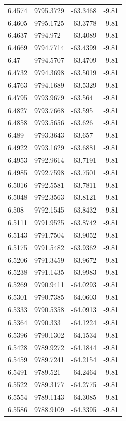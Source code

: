 \begin{table}[H]
\begin{tabular}{llll}
6.4574 & 9795.3729 & -63.3468 & -9.81 \\
6.4605 & 9795.1725 & -63.3778 & -9.81 \\
6.4637 & 9794.972 & -63.4089 & -9.81 \\
6.4669 & 9794.7714 & -63.4399 & -9.81 \\
6.47 & 9794.5707 & -63.4709 & -9.81 \\
6.4732 & 9794.3698 & -63.5019 & -9.81 \\
6.4763 & 9794.1689 & -63.5329 & -9.81 \\
6.4795 & 9793.9679 & -63.564 & -9.81 \\
6.4827 & 9793.7668 & -63.595 & -9.81 \\
6.4858 & 9793.5656 & -63.626 & -9.81 \\
6.489 & 9793.3643 & -63.657 & -9.81 \\
6.4922 & 9793.1629 & -63.6881 & -9.81 \\
6.4953 & 9792.9614 & -63.7191 & -9.81 \\
6.4985 & 9792.7598 & -63.7501 & -9.81 \\
6.5016 & 9792.5581 & -63.7811 & -9.81 \\
6.5048 & 9792.3563 & -63.8121 & -9.81 \\
6.508 & 9792.1545 & -63.8432 & -9.81 \\
6.5111 & 9791.9525 & -63.8742 & -9.81 \\
6.5143 & 9791.7504 & -63.9052 & -9.81 \\
6.5175 & 9791.5482 & -63.9362 & -9.81 \\
6.5206 & 9791.3459 & -63.9672 & -9.81 \\
6.5238 & 9791.1435 & -63.9983 & -9.81 \\
6.5269 & 9790.9411 & -64.0293 & -9.81 \\
6.5301 & 9790.7385 & -64.0603 & -9.81 \\
6.5333 & 9790.5358 & -64.0913 & -9.81 \\
6.5364 & 9790.333 & -64.1224 & -9.81 \\
6.5396 & 9790.1302 & -64.1534 & -9.81 \\
6.5428 & 9789.9272 & -64.1844 & -9.81 \\
6.5459 & 9789.7241 & -64.2154 & -9.81 \\
6.5491 & 9789.521 & -64.2464 & -9.81 \\
6.5522 & 9789.3177 & -64.2775 & -9.81 \\
6.5554 & 9789.1143 & -64.3085 & -9.81 \\
6.5586 & 9788.9109 & -64.3395 & -9.81 \\

\end{tabular}
\end{table}
